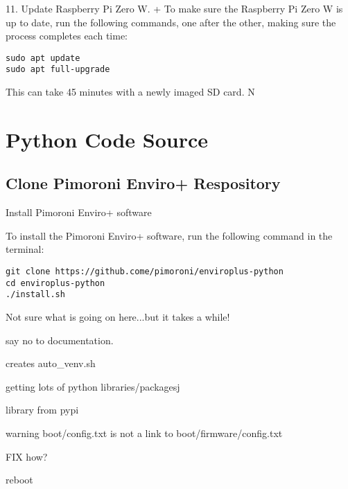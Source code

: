 \documentclass{article}
\begin{document}
            
  11. Update Raspberry Pi Zero W.
  + To make sure the Raspberry Pi Zero W is up to date, run the following commands, one after the other, making sure the process completes each time:
  

\begin{verbatim}
sudo apt update
sudo apt full-upgrade
\end{verbatim}

This can take 45 minutes with a newly imaged SD card. N



\section{Python Code Source}

\subsection{Clone Pimoroni Enviro+ Respository}

Install Pimoroni Enviro+ software


To install the Pimoroni Enviro+ software, run the following command in the terminal:

\begin{verbatim}
git clone https://github.come/pimoroni/enviroplus-python
cd enviroplus-python
./install.sh
\end{verbatim}


Not sure what is going on here...but it takes a while!

say no to documentation. 

creates auto\_venv.sh

getting lots of python libraries/packagesj

library from pypi

warning boot/config.txt is not a link to boot/firmware/config.txt

FIX how?

reboot
\end{document}
